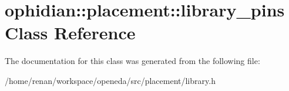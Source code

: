 \hypertarget{classophidian_1_1placement_1_1library__pins}{\section{ophidian\-:\-:placement\-:\-:library\-\_\-pins Class Reference}
\label{classophidian_1_1placement_1_1library__pins}
}


The documentation for this class was generated from the following file\-:\begin{DoxyCompactItemize}
\item 
/home/renan/workspace/openeda/src/placement/library.\-h\end{DoxyCompactItemize}
